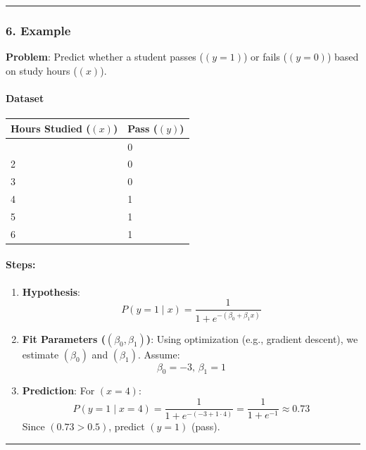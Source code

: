 \documentclass[12pt]{book}
\begin{document}
\begin{center}\rule{0.5\linewidth}{0.5pt}\end{center}

\subsubsection{\texorpdfstring{6.
\textbf{Example}}{6. Example}}\label{example}

\textbf{Problem}: Predict whether a student passes (\(( y=1 )\)) or
fails (\(( y=0 )\)) based on study hours (\(( x )\)).

\paragraph{Dataset}\label{dataset}

\begin{longtable}[]{@{}ll@{}}
\toprule\noalign{}
Hours Studied (\(( x )\)) & Pass (\(( y )\)) \\
\midrule\noalign{}
\endhead
\bottomrule\noalign{}
\endlastfoot
1 & 0 \\
2 & 0 \\
3 & 0 \\
4 & 1 \\
5 & 1 \\
6 & 1 \\
\end{longtable}

\paragraph{Steps:}\label{steps}

\begin{enumerate}
\def\labelenumi{\arabic{enumi}.}
\item
  \textbf{Hypothesis}: \[
  P(y=1 \mid x) = \frac{1}{1 + e^{-(\beta_0 + \beta_1 x)}}
  \]
\item
  \textbf{Fit Parameters (\(( \beta_0, \beta_1 )\))}: Using optimization
  (e.g., gradient descent), we estimate \(( \beta_0 )\) and
  \(( \beta_1 )\). Assume: \[
  \beta_0 = -3, \, \beta_1 = 1
  \]
\item
  \textbf{Prediction}: For \(( x = 4 )\): \[
  P(y=1 \mid x=4) = \frac{1}{1 + e^{-(-3 + 1 \cdot 4)}} = \frac{1}{1 + e^{-1}} \approx 0.73
  \] Since \(( 0.73 > 0.5 )\), predict \(( y = 1 )\) (pass).
\end{enumerate}

\begin{center}\rule{0.5\linewidth}{0.5pt}\end{center}
\end{document}
